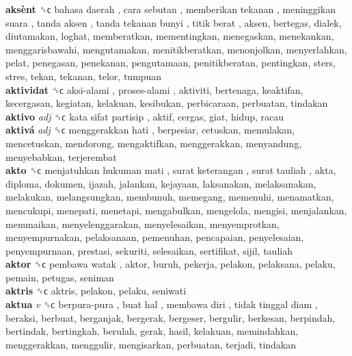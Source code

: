 \textbf{aksènt} ␝ϲ   bahasa daerah ,  cara sebutan ,  memberikan tekanan ,  meninggikan suara ,  tanda aksen ,  tanda tekanan bunyi ,  titik berat , aksen, bertegas, dialek, diutamakan, loghat, memberatkan, mementingkan, menegaskan, menekankan, menggarisbawahi, mengutamakan, menitikberatkan, menonjolkan, menyerlahkan, pelat, penegasan, penekanan, pengutamaan, penitikberatan, pentingkan, sters, stres, tekan, tekanan, telor, tumpuan  \\
\textbf{aktividat} ␝ϲ   aksi-alami ,  proses-alami , aktiviti, bertenaga, keaktifan, kecergasan, kegiatan, kelakuan, kesibukan, perbicaraan, perbuatan, tindakan  \\
\textbf{aktivo} \emph{adj}  ␝ϲ   kata sifat partisip , aktif, cergas, giat, hidup, racau  \\
\textbf{aktivá} \emph{adj}  ␝ϲ   menggerakkan hati , berpesiar, cetuskan, memulakan, mencetuskan, mendorong, mengaktifkan, menggerakkan, menyandung, menyebabkan, terjerembat  \\
\textbf{akto} ␝ϲ   menjatuhkan hukuman mati ,  surat keterangan ,  surat tauliah , akta, diploma, dokumen, ijazah, jalankan, kejayaan, laksanakan, melaksanakan, melakukan, melangsungkan, membunuh, memegang, memenuhi, menamatkan, mencukupi, menepati, menetapi, mengabulkan, mengelola, mengisi, menjalankan, menunaikan, menyelenggarakan, menyelesaikan, menyemprotkan, menyempurnakan, pelaksanaan, pemenuhan, pencapaian, penyelesaian, penyempurnaan, prestasi, sekuriti, selesaikan, sertifikat, sijil, tauliah  \\
\textbf{aktor} ␝ϲ   pembawa watak , aktor, buruh, pekerja, pelakon, pelaksana, pelaku, pemain, petugas, seniman  \\
\textbf{aktris} ␝ϲ  aktris, pelakon, pelaku, seniwati  \\
\textbf{aktua} \emph{v}  ␝ϲ   berpura-pura ,  buat hal ,  membawa diri ,  tidak tinggal diam , beraksi, berbuat, berganjak, bergerak, bergeser, bergulir, berkesan, berpindah, bertindak, bertingkah, berulah, gerak, hasil, kelakuan, memindahkan, menggerakkan, menggulir, mengisarkan, perbuatan, terjadi, tindakan  \\
